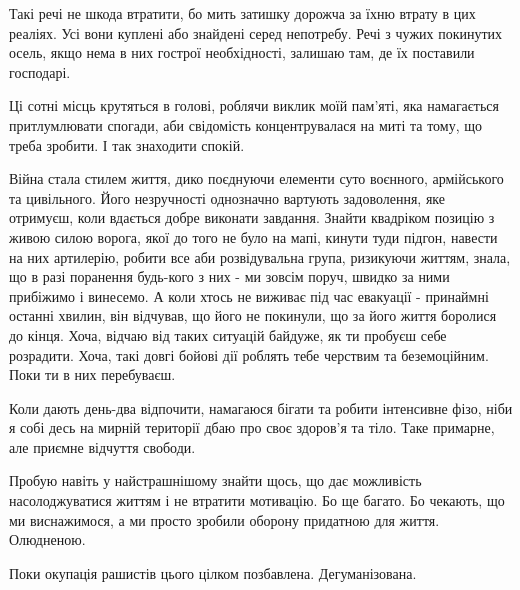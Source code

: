 Такі речі не шкода втратити, бо мить затишку дорожча за їхню втрату в цих
реаліях. Усі вони куплені або знайдені серед непотребу. Речі з чужих покинутих
осель, якщо нема в них гострої необхідності, залишаю там, де їх поставили
господарі. 

Ці сотні місць крутяться в голові, роблячи виклик моїй пам'яті, яка намагається
притлумлювати спогади, аби свідомість концентрувалася на миті та тому, що треба
зробити. І так знаходити спокій.

Війна стала стилем життя, дико поєднуючи елементи суто воєнного, армійського та
цивільного. Його незручності однозначно вартують задоволення, яке отримуєш,
коли вдається добре виконати завдання. Знайти квадріком позицію з живою силою
ворога, якої до того не було на мапі, кинути туди підгон, навести на них
артилерію, робити все аби розвідувальна група, ризикуючи життям, знала, що в
разі поранення будь-кого з них - ми зовсім поруч, швидко за ними прибіжимо і
винесемо. А коли хтось не виживає під час евакуації - принаймні останні хвилин,
він відчував, що його не покинули, що за його життя боролися до кінця. Хоча,
відчаю від таких ситуацій байдуже, як ти пробуєш себе розрадити. Хоча, такі
довгі бойові дії роблять тебе черствим та беземоційним. Поки ти в них
перебуваєш.

Коли дають день-два відпочити, намагаюся бігати та робити інтенсивне фізо, ніби
я собі десь на мирній території дбаю про своє здоров'я та тіло. Таке примарне,
але приємне відчуття свободи.

Пробую навіть у найстрашнішому знайти щось, що дає можливість насолоджуватися
життям і не втратити мотивацію. Бо ще багато. Бо чекають, що ми виснажимося, а
ми просто зробили оборону придатною для життя. Олюдненою. 

Поки окупація рашистів цього цілком позбавлена. Дегуманізована.

